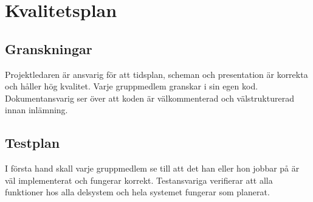 \section{Kvalitetsplan}

\subsection{Granskningar}
Projektledaren är ansvarig för att tidsplan, scheman och presentation är korrekta och håller hög kvalitet. Varje gruppmedlem granskar i sin egen kod. Dokumentansvarig ser över att koden är välkommenterad och välstrukturerad innan inlämning.

\subsection{Testplan}
I första hand skall varje gruppmedlem se till att det han eller hon jobbar på är väl implementerat och fungerar korrekt. Testansvariga verifierar att alla funktioner hos alla delsystem och hela systemet fungerar som planerat.
